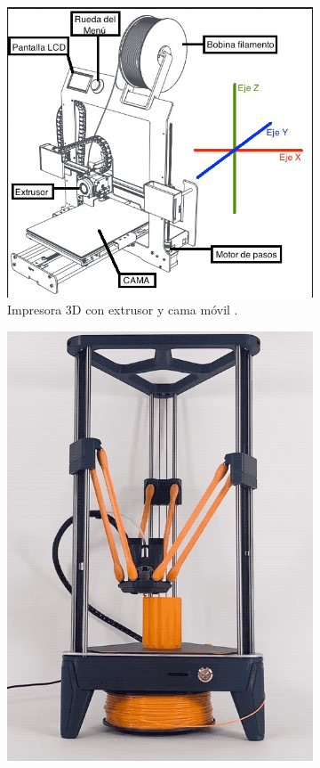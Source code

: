 \begin{figure}[h!]
     \begin{subfigure}[h]{0.45\linewidth} 
        \centering
        \includegraphics[scale=0.4]{figuras/impresora3d_1.jpg}
        \caption{Impresora 3D con extrusor y cama móvil \cite{GobCanarias}.}
        \label{fig:impresora3d_1}
    \end{subfigure}
    \begin{subfigure}[h]{0.45\linewidth} 
        \centering
        \includegraphics[scale=0.3]{figuras/impresora3d_2.jpg}

\end{subfigure}
\end{figure}
